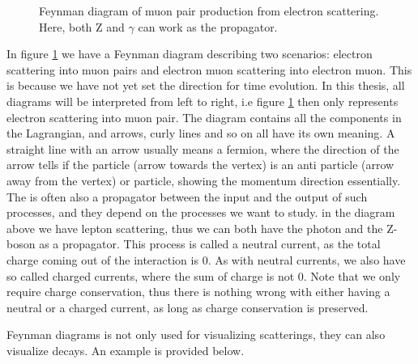 \begin{figure}[h!]
    \centering
    \caption{Feynman diagram of muon pair production from electron scattering. Here, both Z and $\gamma$ can work as the propagator.}
    
    \label{fig:eemm_scat}
\end{figure}

In figure \ref{fig:eemm_scat} we have a Feynman diagram describing two scenarios: electron scattering into muon pairs and 
electron muon scattering into electron muon. This is because we have not yet set the direction for time evolution. In this thesis, all 
diagrams will be interpreted from left to right, i.e figure \ref{fig:eemm_scat} then only represents electron scattering into muon pair. 
The diagram contains all the components in the Lagrangian, and arrows, curly lines and so on all have its own meaning. A straight line with 
an arrow usually means a fermion, where the direction of the arrow tells if the particle (arrow towards the vertex) is an anti particle (arrow away from the vertex) 
or particle, showing the momentum direction essentially. The is often also a propagator between the input and the output of such processes, 
and they depend on the processes we want to study. in the diagram above we have lepton scattering, thus we can both have the photon and the 
Z-boson as a propagator. This process is called a neutral current\cite{Pich:819632}, as the total charge coming out of the interaction is 0. 
As with neutral currents, we also have so called charged currents, where the sum of charge is not 0. Note that we only require charge conservation,
thus there is nothing wrong with either having a neutral or a charged current, as long as charge conservation is preserved. \par 
Feynman diagrams is not only used for visualizing scatterings, they can also visualize decays. An example is provided below. 

